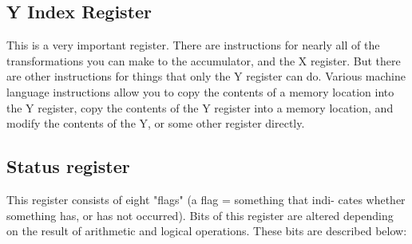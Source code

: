 \documentclass{article}
\begin{document}
  \subsection{Y Index Register}

    This is a very important register. There are instructions for nearly
  all of the transformations you can make to the accumulator, and the X
  register. But there are other instructions for things that only the Y
  register can do. Various machine language instructions allow you to copy
  the contents of a memory location into the Y register, copy the contents
  of the Y register into a memory location, and modify the contents of the
  Y, or some other register directly.


  \subsection{Status register}

    This register consists of eight "flags" (a flag = something that indi-
  cates whether something has, or has not occurred). Bits of this register
  are altered depending on the result of arithmetic and logical operations.
  These bits are described below:
\end{document}
